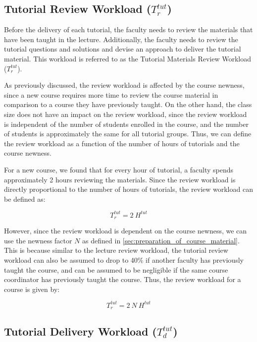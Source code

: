 \subsection{Tutorial Review Workload (\texorpdfstring{\(T_r^{tut}\)}{})}

Before the delivery of each tutorial, the faculty needs to review the materials that have been taught in the lecture. Additionally, the faculty needs to review the tutorial questions and solutions and devise an approach to deliver the tutorial material. This workload is referred to as the Tutorial Materials Review Workload (\(T_r^{tut}\)).

As previously discussed, the review workload is affected by the course newness, since a new course requires more time to review the course material in comparison to a course they have previously taught. On the other hand, the class size does not have an impact on the review workload, since the review workload is independent of the number of students enrolled in the course, and the number of students is approximately the same for all tutorial groups. Thus, we can define the review workload as a function of the number of hours of tutorials and the course newness.

For a new course, we found that for every hour of tutorial, a faculty spends approximately 2 hours reviewing the materials. Since the review workload is directly proportional to the number of hours of tutorials, the review workload can be defined as:

\begin{equation*}
  T_r^{tut} = 2\ H^{tut}
\end{equation*}

However, since the review workload is dependent on the course newness, we can use the newness factor \(N\) as defined in \autoref{sec:preparation_of_course_material}. This is because similar to the lecture review workload, the tutorial review workload can also be assumed to drop to 40\% if another faculty has previously taught the course, and can be assumed to be negligible if the same course coordinator has previously taught the course. Thus, the review workload for a course is given by:

\begin{equation}
  \label{eqn:tutorial-review-workload}
  T_r^{tut} = 2\ N \ H^{tut}
\end{equation}

\subsection{Tutorial Delivery Workload (\texorpdfstring{\(T_d^{tut}\)}{})}

